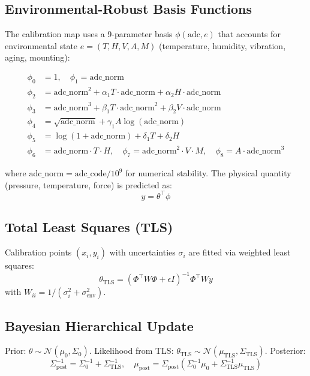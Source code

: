 \documentclass[11pt]{article}
\begin{document}
\subsection{Environmental-Robust Basis Functions}

The calibration map uses a 9-parameter basis $\phi(\text{adc}, e)$ that accounts for environmental state $e = (T, H, V, A, M)$ (temperature, humidity, vibration, aging, mounting):

\begin{align}
\phi_0 &= 1, \quad \phi_1 = \text{adc\_norm} \\
\phi_2 &= \text{adc\_norm}^2 + \alpha_1 T \cdot \text{adc\_norm} + \alpha_2 H \cdot \text{adc\_norm} \\
\phi_3 &= \text{adc\_norm}^3 + \beta_1 T \cdot \text{adc\_norm}^2 + \beta_2 V \cdot \text{adc\_norm} \\
\phi_4 &= \sqrt{\text{adc\_norm}} + \gamma_1 A \log(\text{adc\_norm}) \\
\phi_5 &= \log(1 + \text{adc\_norm}) + \delta_1 T + \delta_2 H \\
\phi_6 &= \text{adc\_norm} \cdot T \cdot H, \quad
\phi_7 = \text{adc\_norm}^2 \cdot V \cdot M, \quad
\phi_8 = A \cdot \text{adc\_norm}^3
\end{align}

where $\text{adc\_norm} = \text{adc\_code} / 10^9$ for numerical stability. The physical quantity (pressure, temperature, force) is predicted as:
\[
y = \theta^\top \phi
\]

\subsection{Total Least Squares (TLS)}

Calibration points $(x_i, y_i)$ with uncertainties $\sigma_i$ are fitted via weighted least squares:
\[
\theta_{\text{TLS}} = ( \Phi^\top W \Phi + \epsilon I )^{-1} \Phi^\top W y
\]
with $W_{ii} = 1/(\sigma_i^2 + \sigma_{\text{env}}^2)$.

\subsection{Bayesian Hierarchical Update}

Prior: $\theta \sim \mathcal{N}(\mu_0, \Sigma_0)$. Likelihood from TLS: $\theta_{\text{TLS}} \sim \mathcal{N}(\mu_{\text{TLS}}, \Sigma_{\text{TLS}})$. Posterior:
\[
\Sigma_{\text{post}}^{-1} = \Sigma_0^{-1} + \Sigma_{\text{TLS}}^{-1}, \quad
\mu_{\text{post}} = \Sigma_{\text{post}} \left( \Sigma_0^{-1} \mu_0 + \Sigma_{\text{TLS}}^{-1} \mu_{\text{TLS}} \right)
\]
\end{document}
